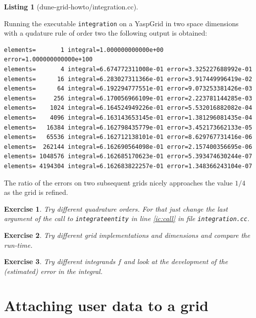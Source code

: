 \documentclass[11pt,a4paper,headinclude,footinclude,DIV16,normalheadings]{scrreprt}
\newtheorem{exc}{Exercise}[chapter]
\newtheorem{lst}{Listing}
\begin{document}
\begin{lst}[dune-grid-howto/integration.cc] \mbox{}


\end{lst}

Running the executable \lstinline!integration! on a YaspGrid in two
space dimensions with a qudature rule of order
two the following output is obtained:

\begin{lstlisting}[basicstyle=\ttfamily\scriptsize]
elements=       1 integral=1.000000000000e+00 error=1.000000000000e+100
elements=       4 integral=6.674772311008e-01 error=3.325227688992e-01
elements=      16 integral=6.283027311366e-01 error=3.917449996419e-02
elements=      64 integral=6.192294777551e-01 error=9.073253381426e-03
elements=     256 integral=6.170056966109e-01 error=2.223781144285e-03
elements=    1024 integral=6.164524949226e-01 error=5.532016882082e-04
elements=    4096 integral=6.163143653145e-01 error=1.381296081435e-04
elements=   16384 integral=6.162798435779e-01 error=3.452173662133e-05
elements=   65536 integral=6.162712138101e-01 error=8.629767731416e-06
elements=  262144 integral=6.162690564098e-01 error=2.157400356695e-06
elements= 1048576 integral=6.162685170623e-01 error=5.393474630244e-07
elements= 4194304 integral=6.162683822257e-01 error=1.348366243104e-07
\end{lstlisting}

The ratio of the errors on two subsequent grids nicely approaches the
value $1/4$ as the grid is refined.


\begin{exc} Try different quadrature orders. For that just change the
  last argument of the call to \lstinline!integrateentity! in line
  \ref{ic:call} in file \lstinline!integration.cc!.
\end{exc}

\begin{exc} Try different grid implementations and dimensions and
  compare the run-time.
\end{exc}

\begin{exc} Try different integrands $f$ and look at the development
  of the (estimated) error in the integral. 
\end{exc}

\chapter{Attaching user data to a grid}
\end{document}
